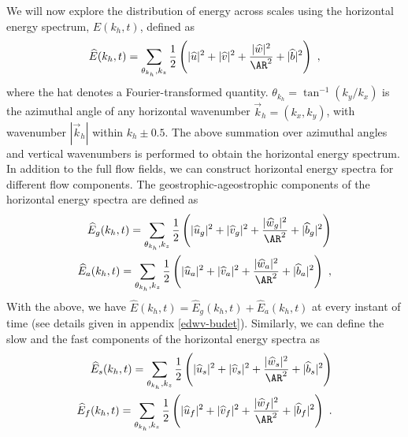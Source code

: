 \documentclass[../Rajarshi-thesis-draft.tex]{subfiles}
\begin{document}
We will now explore the distribution of energy across scales using the horizontal energy spectrum, $\hat{E}(k_h, t)$, defined as 
\begin{align}
    \begin{split}
        \hat{E}(k_h, t) = \sum\limits_{\theta_{k_h},k_z} \frac12 \left( |\hat{u}|^2 + |\hat{v}|^2 + \frac{|\hat{w}|^2}{\AR^2}+ |\hat{b}|^2\right) \ ,
    \end{split}
\end{align}
where the hat denotes a Fourier-transformed quantity. $\theta_{k_h} = \tan^{-1}(k_y/k_x)$ is the azimuthal angle of any horizontal wavenumber $\vec{k}_h = (k_x,k_y)$, with wavenumber $|\vec{k}_h|$ within $k_h \pm 0.5$. The above summation over azimuthal angles and vertical wavenumbers is performed to obtain the horizontal energy spectrum. In addition to the full flow fields, we can construct horizontal energy spectra for different flow components. The geostrophic-ageostrophic components of the horizontal energy spectra are defined as 
\begin{subequations}
    \begin{align}
        \begin{split}
            \hat{E}_{g}(k_h, t) = \sum\limits_{\theta_{k_h},k_z} \frac12\left( |\hat{u}_g|^2 + |\hat{v}_g|^2 + \frac{|\hat{w}_g|^2}{\AR^2}+ |\hat{b}_g|^2\right)
        \end{split} \\
        \begin{split}
            \hat{E}_{a}(k_h, t) = \sum\limits_{\theta_{k_h},k_z} \frac12 \left( |\hat{u}_a|^2 + |\hat{v}_a|^2 + \frac{|\hat{w}_a|^2}{\AR^2}+ |\hat{b}_a|^2\right) \ , 
        \end{split}
    \end{align}
\end{subequations}
 With the above, we have $\hat{E}(k_h, t) = \hat{E}_{g}(k_h, t) + \hat{E}_{a}(k_h, t)$ at every instant of time (see details given in appendix \ref{edwv-budet}). Similarly, we can define the slow and the fast components of the horizontal energy spectra as 
\begin{subequations}
    \begin{align}
        \begin{split}
            \hat{E}_{s}(k_h, t) = \sum\limits_{\theta_{k_h},k_z} \frac12 \left( |\hat{u}_s|^2 + |\hat{v}_s|^2 + \frac{|\hat{w}_s|^2}{\AR^2}+ |\hat{b}_s|^2\right)
        \end{split} \\
        \begin{split}
            \hat{E}_{f}(k_h, t) = \sum\limits_{\theta_{k_h},k_z} \frac12 \left( |\hat{u}_f|^2 + |\hat{v}_f|^2 + \frac{|\hat{w}_f|^2}{\AR^2}+ |\hat{b}_f|^2\right) \ . 
        \end{split}
    \end{align}
\end{subequations}
\end{document}
